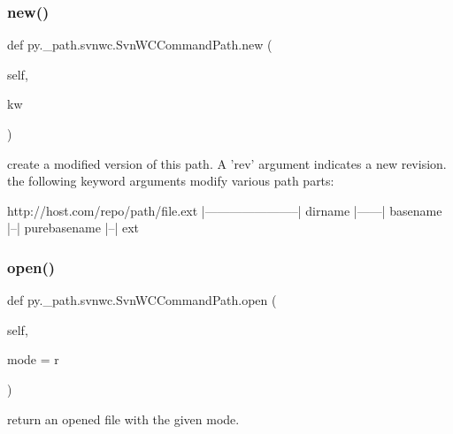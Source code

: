 \subsubsection{\texorpdfstring{new()}{new()}}
{\footnotesize\ttfamily def py.\+\_\+path.\+svnwc.\+Svn\+W\+C\+Command\+Path.\+new (\begin{DoxyParamCaption}\item[{}]{self,  }\item[{}]{kw }\end{DoxyParamCaption})}

\begin{DoxyVerb}create a modified version of this path. A 'rev' argument
    indicates a new revision.
    the following keyword arguments modify various path parts:

      http://host.com/repo/path/file.ext
      |-----------------------|          dirname
                        |------| basename
                        |--|     purebasename
                            |--| ext
\end{DoxyVerb}
 \mbox{\label{classpy_1_1__path_1_1svnwc_1_1_svn_w_c_command_path_ae9211cd255788742355163db34ebe017}} 
\subsubsection{\texorpdfstring{open()}{open()}}
{\footnotesize\ttfamily def py.\+\_\+path.\+svnwc.\+Svn\+W\+C\+Command\+Path.\+open (\begin{DoxyParamCaption}\item[{}]{self,  }\item[{}]{mode = {\ttfamily \textquotesingle{}r\textquotesingle{}} }\end{DoxyParamCaption})}

\begin{DoxyVerb}return an opened file with the given mode. \end{DoxyVerb}
 \mbox{\label{classpy_1_1__path_1_1svnwc_1_1_svn_w_c_command_path_af89cd5b7ae42106ef1d683683a3dafee}} 
